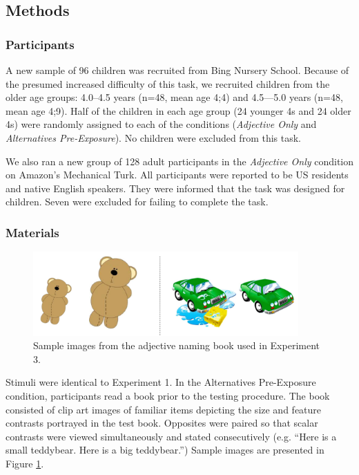 \documentclass[man]{apa2}
\begin{document}
\subsection{Methods}

\subsubsection{Participants}

A new sample of 96 children was recruited from Bing Nursery School.  Because of the presumed increased difficulty of this task, we recruited children from the older age groups: 4.0--4.5 years (n=48, mean age 4;4) and 4.5---5.0 years (n=48, mean age 4;9).  Half of the children in each age group (24 younger 4s and 24 older 4s) were randomly assigned to each of the conditions (\emph{Adjective Only} and \emph{Alternatives Pre-Exposure}). No children were excluded from this task. 

We also ran a new group of 128 adult participants in the \emph{Adjective Only} condition on Amazon's Mechanical Turk.  All participants were reported to be US residents and native English speakers.  They were informed that the task was designed for children.  Seven were excluded for failing to complete the task. 

\subsubsection{Materials}

\begin{figure}[t] 
  \begin{center} 
    \includegraphics[width=4in]{figures/aliens_book_demo_mod.png} 
    \caption{\label{fig:book_demo} Sample images from the adjective naming book used in Experiment 3.}
  \end{center} 
\end{figure}

Stimuli were identical to Experiment 1. In the Alternatives Pre-Exposure condition, participants read a book prior to the testing procedure.  The book consisted of clip art images of familiar items depicting the size and feature contrasts portrayed in the test book. Opposites were paired so that scalar contrasts were viewed simultaneously and stated consecutively (e.g. ``Here is a small teddybear.  Here is a big teddybear.'')  Sample images are presented in Figure \ref{fig:book_demo}.
\end{document}
